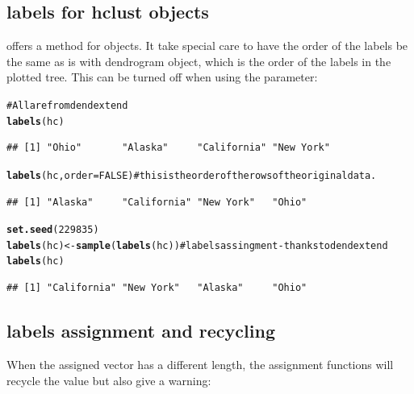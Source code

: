 \documentclass[shortnames,nojss,article]{jss}\usepackage{graphicx, color}
\makeatletter
\newcommand{\hlfunctioncall}[1]{\textcolor[rgb]{0.501960784313725,0,0.329411764705882}{\textbf{#1}}}%
\newcommand{\hlcomment}[1]{\textcolor[rgb]{0.180392156862745,0.6,0.341176470588235}{#1}}%
\newenvironment{kframe}{%
 \def\at@end@of@kframe{}%
 \ifinner\ifhmode%
  \def\at@end@of@kframe{\end{minipage}}%
  \begin{minipage}{\columnwidth}%
 \fi\fi%
 \def\FrameCommand##1{\hskip\@totalleftmargin \hskip-\fboxsep
 \colorbox{shadecolor}{##1}\hskip-\fboxsep
     \hskip-\linewidth \hskip-\@totalleftmargin \hskip\columnwidth}%
 \MakeFramed {\advance\hsize-\width
   \@totalleftmargin\z@ \linewidth\hsize
   \@setminipage}}%
 {\par\unskip\endMakeFramed%
 \at@end@of@kframe}
\newenvironment{knitrout}{}{} %
\makeatother
\begin{document}
\subsection{labels for hclust objects}

 offers a  method for  objects. It take special care to have the order of the labels be the same as is with dendrogram object, which is the order of the labels in the plotted tree. This can be turned off when using the  parameter:

\begin{knitrout}
\color{fgcolor}\begin{kframe}
\begin{alltt}
\hlcomment{# All are from dendextend}
\hlfunctioncall{labels}(hc)
\end{alltt}
\begin{verbatim}
## [1] "Ohio"       "Alaska"     "California" "New York"
\end{verbatim}
\begin{alltt}
\hlfunctioncall{labels}(hc, order = FALSE)  \hlcomment{# this is the order of the rows of the original data.}
\end{alltt}
\begin{verbatim}
## [1] "Alaska"     "California" "New York"   "Ohio"
\end{verbatim}
\begin{alltt}
\hlfunctioncall{set.seed}(229835)
\hlfunctioncall{labels}(hc) <- \hlfunctioncall{sample}(\hlfunctioncall{labels}(hc))  \hlcomment{# labels assingment - thanks to dendextend}
\hlfunctioncall{labels}(hc)
\end{alltt}
\begin{verbatim}
## [1] "California" "New York"   "Alaska"     "Ohio"
\end{verbatim}
\end{kframe}
\end{knitrout}



\subsection{labels assignment and recycling}

When the assigned vector has a different length, the  assignment functions will recycle the value but also give a warning:
\end{document}
